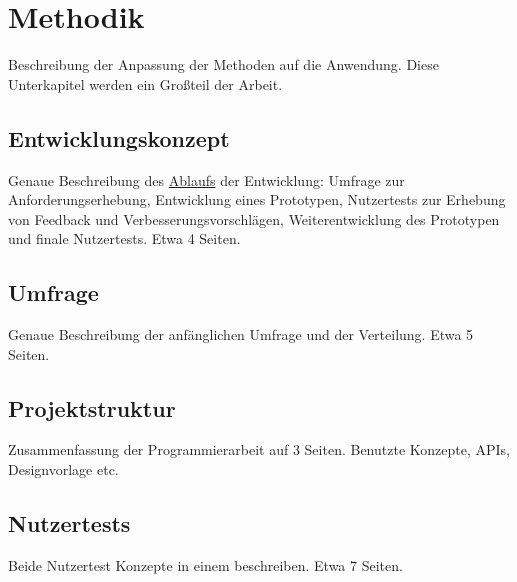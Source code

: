 \chapter{Methodik} %
Beschreibung der Anpassung der Methoden auf die Anwendung.
Diese Unterkapitel werden ein Großteil der Arbeit. 

\section{Entwicklungskonzept}
Genaue Beschreibung des \underline{Ablaufs} der Entwicklung:
Umfrage zur Anforderungserhebung, Entwicklung eines Prototypen, Nutzertests zur Erhebung von Feedback und Verbesserungsvorschlägen, Weiterentwicklung des Prototypen und finale Nutzertests.
Etwa 4 Seiten.

\section{Umfrage} %
Genaue Beschreibung der anfänglichen Umfrage und der Verteilung.
Etwa 5 Seiten.

\section{Projektstruktur} %
Zusammenfassung der Programmierarbeit auf 3 Seiten.
Benutzte Konzepte, APIs, Designvorlage etc.\cite{Schnell2018MethodenES}

\section{Nutzertests} %
Beide Nutzertest Konzepte in einem beschreiben.
Etwa 7 Seiten.